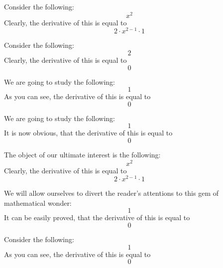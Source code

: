 \documentclass{article}
\begin{document}
Consider the following:
\begin{equation}
x ^{2 } 
\end{equation}
Clearly, the derivative of this is equal to
\begin{equation}
2 \cdot x ^{2 - 1 } \cdot 1 
\end{equation}

Consider the following:
\begin{equation}
2 
\end{equation}
Clearly, the derivative of this is equal to
\begin{equation}
0 
\end{equation}

We are going to study the following:
\begin{equation}
1 
\end{equation}
As you can see, the derivative of this is equal to
\begin{equation}
0 
\end{equation}

We are going to study the following:
\begin{equation}
1 
\end{equation}
It is now obvious, that the derivative of this is equal to
\begin{equation}
0 
\end{equation}

The object of our ultimate interest is the following:
\begin{equation}
x ^{2 } 
\end{equation}
Clearly, the derivative of this is equal to
\begin{equation}
2 \cdot x ^{2 - 1 } \cdot 1 
\end{equation}

We will allow ourselves to divert the reader's attentions to this gem of mathematical wonder:
\begin{equation}
1 
\end{equation}
It can be easily proved, that the derivative of this is equal to
\begin{equation}
0 
\end{equation}

Consider the following:
\begin{equation}
1 
\end{equation}
As you can see, the derivative of this is equal to
\begin{equation}
0 
\end{equation}
\end{document}
